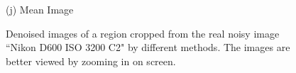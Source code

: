\documentclass[10pt,onecolumn,letterpaper]{article}
\begin{document}
\begin{figure}[H]
{\begin{minipage}[t]{0.196\textwidth}
{\footnotesize (j) Mean Image \cite{crosschannel2016} }
\end{minipage}
}
\caption{Denoised images of a region cropped from the real noisy image ``Nikon D600 ISO 3200 C2" \cite{crosschannel2016} by different methods. The images are better viewed by zooming in on screen.} 
\label{fig14}
\end{figure}

\begin{figure}[H]\vspace{1mm}
\centering
{}
\end{figure}
\end{document}
